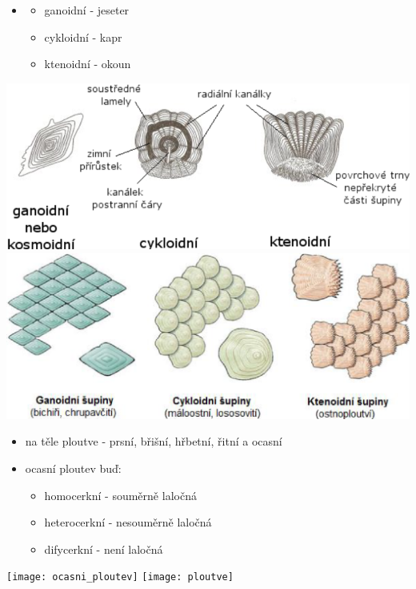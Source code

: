 \documentclass{article}
\begin{document}
\hspace{-0.03185\textwidth}\begin{minipage}{0.275\textwidth}\raggedleft
  \begin{itemize}
    \item[]
    \begin{itemize}
      \item ganoidní - jeseter
      \item cykloidní - kapr
      \item ktenoidní - okoun
    \end{itemize}
  \end{itemize}
\end{minipage}
\noindent\begin{minipage}{0.715\textwidth}
  \includegraphics[width=0.49\linewidth]{šupiny}
  \includegraphics[width=0.49\linewidth]{šupiny_dva}
\end{minipage}

\hspace{-0.03185\textwidth}\begin{minipage}{0.535\textwidth}\raggedleft
  \begin{itemize}
    \item na těle ploutve - prsní, břišní, hřbetní, řitní a ocasní
    \item ocasní ploutev buď:
    \begin{itemize}
      \item homocerkní - souměrně laločná
      \item heterocerkní - nesouměrně laločná
      \item difycerkní - není laločná
    \end{itemize}
  \end{itemize}
\end{minipage}
\hspace{-0.08\textwidth}\noindent\begin{minipage}{0.455\textwidth}
  \texttt{[image: ocasni\_ploutev]}
  \hspace{0.1\textwidth}
  \texttt{[image: ploutve]}
\end{minipage}
\end{document}
